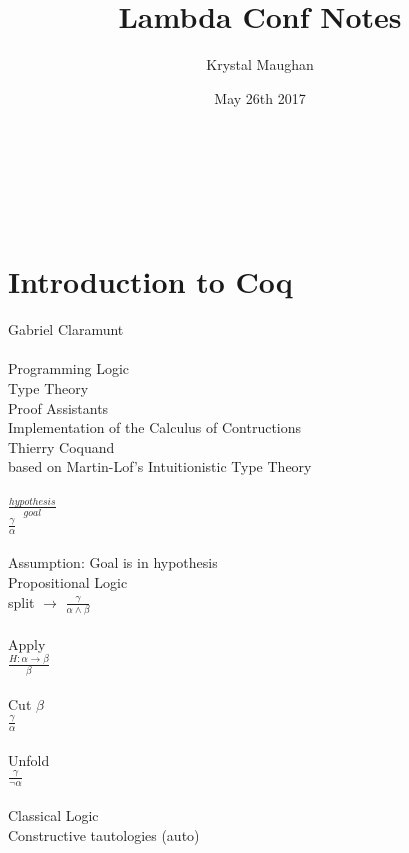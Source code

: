 \documentclass{article}
\title{Lambda Conf Notes}
\author{Krystal Maughan }
\date{May 26th 2017}
\begin{document}
\maketitle

\\
\\
\\
\section{Introduction to Coq} 
Gabriel Claramunt
\\
\\
Programming Logic
\\
Type Theory
\\
Proof Assistants
\\
Implementation of the Calculus of Contructions
\\
Thierry Coquand
\\
based on Martin-Lof's Intuitionistic Type Theory
\\
\\
$\frac{hypothesis}{goal}$
\\
$\frac{\gamma}{\alpha}$
\\
\\
Assumption: Goal is in hypothesis
\\
Propositional Logic
\\
split $\rightarrow$ $\frac{\gamma}{\alpha \land \beta}$
\\
\\
Apply
\\
$\frac{H: \alpha \rightarrow \beta}{\beta}$
\\
\\
Cut $\beta$
\\
$\frac{\gamma}{\alpha}$
\\
\\
Unfold
\\
$\frac{\gamma}{\neg \alpha}$
\\
\\
Classical Logic
\\
Constructive tautologies (auto)
\\
\\
\end{document}
